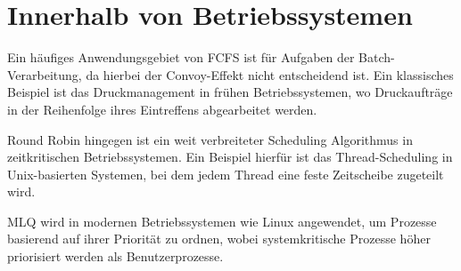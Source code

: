 
\section{Innerhalb von Betriebssystemen}
Ein häufiges Anwendungsgebiet von \ac{FCFS} ist für Aufgaben der Batch-Verarbeitung, da hierbei der Convoy-Effekt nicht entscheidend ist. Ein klassisches Beispiel ist das Druckmanagement in frühen Betriebssystemen, wo Druckaufträge in der Reihenfolge ihres Eintreffens abgearbeitet werden.  %

Round Robin hingegen ist ein weit verbreiteter Scheduling Algorithmus in zeitkritischen Betriebssystemen. Ein Beispiel hierfür ist das Thread-Scheduling in Unix-basierten Systemen, bei dem jedem Thread eine feste Zeitscheibe zugeteilt wird. %

\ac{MLQ} wird in modernen Betriebssystemen wie Linux angewendet, um Prozesse basierend auf ihrer Priorität zu ordnen, wobei systemkritische Prozesse höher priorisiert werden als Benutzerprozesse. %
